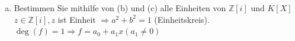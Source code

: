 \documentclass{article}
\newcommand{\Z}{\mathbb{Z}}
\begin{document}
\begin{enumerate}[(a)]
        Wenn wir $1$ durch $b$ teilen, erhalten wir
        durch division mit Rest
        \begin{equation*}
            1=qb+r
        \end{equation*}
        Da nach Annahme $b\neq 1\in R^*$ ist $r\neq 0$.
        Nun unterscheiden wir folgende Fälle:
        \begin{itemize}
            \item
                $q=0\Rightarrow r=1,\delta(b)>\delta(1)$
            \item
                $q\neq 0\Rightarrow r=-qb+1
                \Rightarrow \delta(b)>\delta(1)$
        \end{itemize}
    \item
        \color{blue}
        Bestimmen Sie mithilfe von (b) und (c) alle
        Einheiten von $\Z[i]$ und $K[X]$\\
        \color{black}
        $z\in\Z[i],z$ ist Einheit $\Rightarrow a^2+b^2=1$
        (Einheitskreis).
        $\deg(f)=1\Rightarrow f=a_0+a_1x(a_1\neq 0)$
\end{enumerate}
\end{document}
